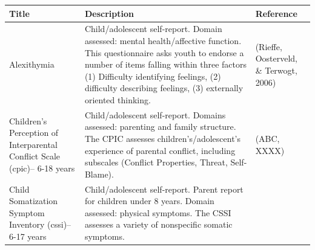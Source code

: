 \documentclass[]{book}
\begin{document}
\begin{longtable}[]{@{}lll@{}}
\toprule
\begin{minipage}[b]{0.32\columnwidth}\raggedright
Title\strut
\end{minipage} & \begin{minipage}[b]{0.32\columnwidth}\raggedright
Description\strut
\end{minipage} & \begin{minipage}[b]{0.27\columnwidth}\raggedright
Reference\strut
\end{minipage}\tabularnewline
\midrule
\endhead
\begin{minipage}[t]{0.32\columnwidth}\raggedright
Alexithymia\strut
\end{minipage} & \begin{minipage}[t]{0.32\columnwidth}\raggedright
Child/adolescent self-report. Domain assessed: mental health/affective function. This questionnaire asks youth to endorse a number of items falling within three factors (1) Difficulty identifying feelings, (2) difficulty describing feelings, (3) externally oriented thinking.\strut
\end{minipage} & \begin{minipage}[t]{0.27\columnwidth}\raggedright
(Rieffe, Oosterveld, \& Terwogt, 2006)\strut
\end{minipage}\tabularnewline
\begin{minipage}[t]{0.32\columnwidth}\raggedright
Children's Perception of Interparental Conflict Scale (cpic)-- 6-18 years\strut
\end{minipage} & \begin{minipage}[t]{0.32\columnwidth}\raggedright
Child/adolescent self-report. Domains assessed: parenting and family structure. The CPIC assesses children's/adolescent's experience of parental conflict, including subscales (Conflict Properties, Threat, Self-Blame).\strut
\end{minipage} & \begin{minipage}[t]{0.27\columnwidth}\raggedright
(ABC, XXXX)\strut
\end{minipage}\tabularnewline
\begin{minipage}[t]{0.32\columnwidth}\raggedright
Child Somatization Symptom Inventory (cssi)-- 6-17 years\strut
\end{minipage} & \begin{minipage}[t]{0.32\columnwidth}\raggedright
Child/adolescent self-report. Parent report for children under 8 years. Domain assessed: physical symptoms. The CSSI assesses a variety of nonspecific somatic symptoms.\strut

\end{minipage}
\end{longtable}
\end{document}
